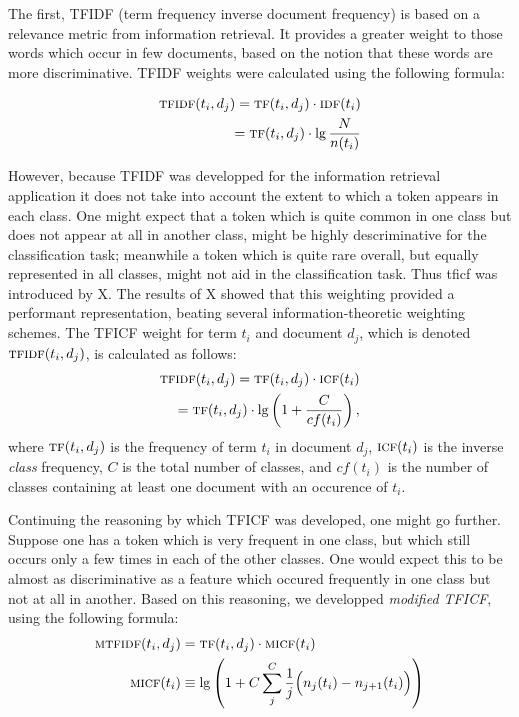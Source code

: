 \documentclass[conference,letterpaper]{IEEEtran}
\begin{document}
The first, TFIDF (term frequency inverse document frequency) is based 
on a relevance metric from information retrieval.  It provides a greater 
weight to those words which occur in 
few documents, based on the notion that these words are more discriminative.
TFIDF weights were calculated using the following formula:

\begin{align}
	\textsc{tfidf}(t_i, d_j) = \textsc{tf}(t_i, d_j) \cdot \textsc{idf}(t_i) \\
	= \textsc{tf}(t_i, d_j) \cdot \lg \frac{N}{n(t_i)}
\end{align}

However, because TFIDF was developped for the information retrieval application
it does not take into account the extent to which a token appears in 
each class.  One might expect that a token which is quite common in one class
but does not appear at all in another class, might be highly descriminative
for the classification task; meanwhile a token which is quite rare overall, 
but equally represented in all classes, might not aid in the classification
task.  Thus tficf was introduced by X.  The results of X showed that 
this weighting provided a performant representation, beating several 
information-theoretic weighting schemes.  The TFICF weight for term $t_i$ and
document $d_j$, which is denoted $\textsc{tfidf}(t_i, d_j)$, is calculated 
as follows:
\begin{align}
	\textsc{tfidf}(t_i, d_j) = \textsc{tf}(t_i, d_j) \cdot \textsc{icf}(t_i) \\
	= \textsc{tf}(t_i, d_j) \cdot \lg \left(1 + \frac{C}{cf(t_i)}\right),
\end{align}
where $\textsc{tf}(t_i, d_j)$ is the frequency of term $t_i$ in document $d_j$,
$\textsc{icf}(t_i)$ is the inverse \textit{class} frequency, $C$ is the 
total number of classes, and $cf(t_i)$ is the number of classes containing at
least one document with an occurence of $t_i$.


Continuing the reasoning by which TFICF was developed, one might go further.
Suppose one has a token which is very frequent in one class, but which still
occurs only a few times in each of the other classes.  One would expect this
to be almost as discriminative as a feature which occured frequently in one
class but not at all in another.  Based on this reasoning, we developped
\textit{modified TFICF}, using the following formula:
\begin{align}
	\textsc{mtfidf}(t_i, d_j) 
		&= \textsc{tf}(t_i, d_j) \cdot \textsc{micf}(t_i) \\
	\textsc{micf}(t_i)
		&\equiv \lg \left(1 
			+ C\sum_j^C \frac{1}{j}\Big(n_{j}(t_i) - n_{j+1}(t_i)\Big) \right)
\end{align}
\end{document}
